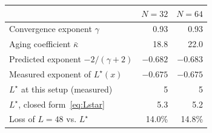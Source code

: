 \begin{tabular}{lrr}
\toprule
 & $N=32$ & $N=64$ \\
\midrule
Convergence exponent $\gamma$ & 0.93 & 0.93 \\
Aging coefficient $\bar\kappa$ & 18.8 & 22.0 \\
Predicted exponent $-2/(\gamma{+}2)$ & $-0.682$ & $-0.683$ \\
Measured exponent of $L^\star(x)$ & $-0.675$ & $-0.675$ \\
$L^\star$ at this setup (measured) & 5 & 5 \\
$L^\star$, closed form~\eqref{eq:Lstar} & 5.3 & 5.2 \\
Loss of $L{=}48$ vs. $L^\star$ & 14.0\% & 14.8\% \\
\bottomrule
\end{tabular}
